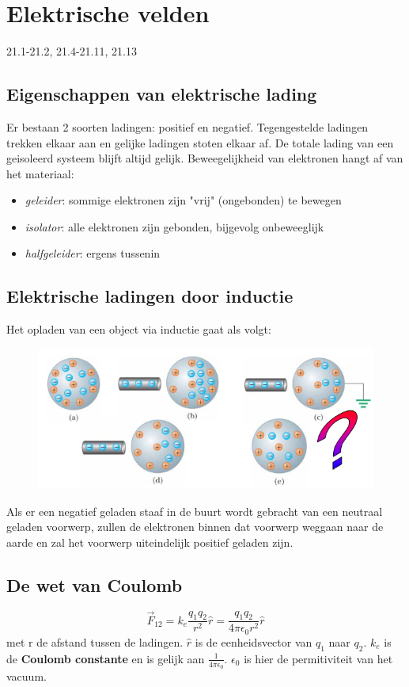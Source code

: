 \documentclass[12pt,a4paper]{article}
\begin{document}
    \section{Elektrische velden}
    21.1-21.2, 21.4-21.11, 21.13
	\subsection{Eigenschappen van elektrische lading}
	Er bestaan 2 soorten ladingen: positief en negatief. Tegengestelde ladingen trekken elkaar aan en gelijke ladingen stoten elkaar af. De totale lading van een geisoleerd systeem blijft altijd gelijk. Beweegelijkheid van elektronen hangt af van het materiaal:
	\begin{itemize}
		\item \textit{geleider}: sommige elektronen zijn "vrij" (ongebonden) te bewegen
		\item \textit{isolator}: alle elektronen zijn gebonden, bijgevolg onbeweeglijk
		\item  \textit{halfgeleider}: ergens tussenin
	\end{itemize}
	
	\subsection{Elektrische ladingen door inductie}
	Het opladen van een object via inductie gaat als volgt:
	\begin{figure}[h]
		\centering
		\includegraphics[width=0.7\linewidth]{inductie}
		\label{inductie}
	\end{figure}
	Als er een negatief geladen staaf in de buurt wordt gebracht van een neutraal geladen voorwerp, zullen de elektronen binnen dat voorwerp weggaan naar de aarde en zal het voorwerp uiteindelijk positief geladen zijn. 
	
	\subsection{De wet van Coulomb}
	\[\vec{F}_12 = k_e\frac{q_1 q_2}{r^2}\hat{r} = \frac{q_1q_2}{4\pi \epsilon_0 r^2}\hat{r}\]
	met r de afstand tussen de ladingen. \(\hat{r}\) is de eenheidsvector van $q_1$ naar $q_2$.
	$k_e$ is de \textbf{Coulomb constante} en is gelijk aan \(\frac{1}{4\pi\epsilon_0}\). $\epsilon_0$ is hier de permitiviteit van het vacuum.
	
\end{document}
